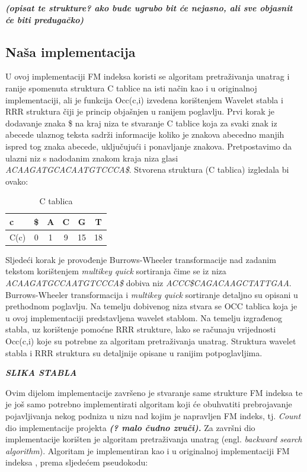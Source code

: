 \emph{\textbf{(opisat te strukture? ako bude ugrubo bit će nejasno, ali sve objasnit će biti predugačko)}}


\subsection{Naša implementacija}
U ovoj implementaciji FM indeksa koristi se algoritam pretraživanja unatrag i ranije spomenuta struktura C tablice na isti način kao i u originalnoj implementaciji, ali je funkcija Occ(c,i) izvedena korištenjem Wavelet stabla i RRR struktura čiji je princip objašnjen u ranijem poglavlju.
Prvi korak je dodavanje znaka \$ na kraj niza te stvaranje C tablice koja za svaki znak iz abecede ulaznog teksta sadrži informacije koliko je znakova abecedno manjih ispred tog znaka abecede, uključujući i ponavljanje znakova. Pretpostavimo da ulazni niz s nadodanim znakom kraja niza glasi \emph{ACAAGATGCACAATGTCCCA\$}. Stvorena struktura (C tablica) izgledala bi ovako:

\begin{table}[htb]
\caption{C tablica}
\label{tbl:ctabl}
\centering
\begin{tabular}{l||ccccc} 
c & \$ & A & C & G & T \\ \hline
C(c) & 0 & 1 & 9 & 15 & 18 \\
\end{tabular}
\end{table}

Sljedeći korak je provođenje Burrows-Wheeler transformacije nad zadanim tekstom korištenjem \emph{multikey quick} sortiranja čime se iz niza \emph{ACAAGATGCCAATGTCCCA\$} dobiva niz \emph{ACCC\$CAGACAAGCTATTGAA}. Burrows-Wheeler transformacija i \emph{multikey quick} sortiranje detaljno su opisani u prethodnom poglavlju.
Na temelju dobivenog niza  stvara se OCC tablica koja je u ovoj implementaciji predstavljena wavelet stablom. Na temelju izgrađenog stabla, uz korištenje pomoćne RRR strukture, lako se računaju  vrijednosti Occ(c,i) koje su potrebne za algoritam pretraživanja unatrag. Struktura wavelet stabla i RRR struktura su detaljnije opisane u ranijim potpoglavljima. 


\emph{\textbf{SLIKA STABLA}}


Ovim dijelom implementacije završeno je stvaranje same strukture FM indeksa te je još samo potrebno implementirati algoritam koji će obuhvatiti prebrojavanje pojavljivanja nekog podniza u nizu nad kojim je napravljen FM indeks, tj. \emph{Count} dio implementacije projekta \textbf{\emph{(? malo čudno zvuči).}}
Za završni dio implementacije korišten je algoritam pretraživanja unatrag (engl. \emph{backward search algorithm}). Algoritam je implementiran kao i u originalnoj implementaciji FM indeksa \cite{fm1}, prema sljedećem pseudokodu:

